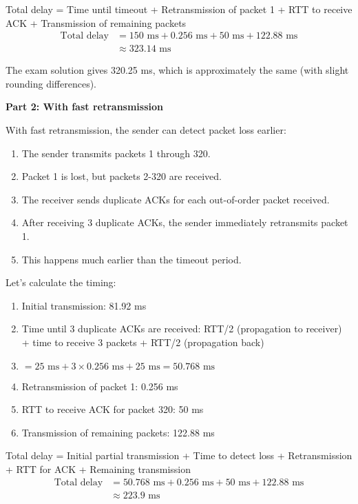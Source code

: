 \documentclass[11pt,a4paper]{article}
\begin{document}
Total delay = Time until timeout + Retransmission of packet 1 + RTT to receive ACK + Transmission of remaining packets
\begin{align}
    \text{Total delay} &= 150 \text{ ms} + 0.256 \text{ ms} + 50 \text{ ms} + 122.88 \text{ ms}\\
    &\approx 323.14 \text{ ms}
\end{align}

The exam solution gives 320.25 ms, which is approximately the same (with slight rounding differences).

\textbf{Part 2: With fast retransmission}

With fast retransmission, the sender can detect packet loss earlier:

\begin{enumerate}
    \item The sender transmits packets 1 through 320.
    \item Packet 1 is lost, but packets 2-320 are received.
    \item The receiver sends duplicate ACKs for each out-of-order packet received.
    \item After receiving 3 duplicate ACKs, the sender immediately retransmits packet 1.
    \item This happens much earlier than the timeout period.
\end{enumerate}

Let's calculate the timing:
\begin{enumerate}
    \item Initial transmission: 81.92 ms
    \item Time until 3 duplicate ACKs are received: RTT/2 (propagation to receiver) + time to receive 3 packets + RTT/2 (propagation back)
    \item $= 25 \text{ ms} + 3 \times 0.256 \text{ ms} + 25 \text{ ms} = 50.768 \text{ ms}$
    \item Retransmission of packet 1: 0.256 ms
    \item RTT to receive ACK for packet 320: 50 ms
    \item Transmission of remaining packets: 122.88 ms
\end{enumerate}

Total delay = Initial partial transmission + Time to detect loss + Retransmission + RTT for ACK + Remaining transmission
\begin{align}
    \text{Total delay} &= 50.768 \text{ ms} + 0.256 \text{ ms} + 50 \text{ ms} + 122.88 \text{ ms}\\
    &\approx 223.9 \text{ ms}
\end{align}
\end{document}
